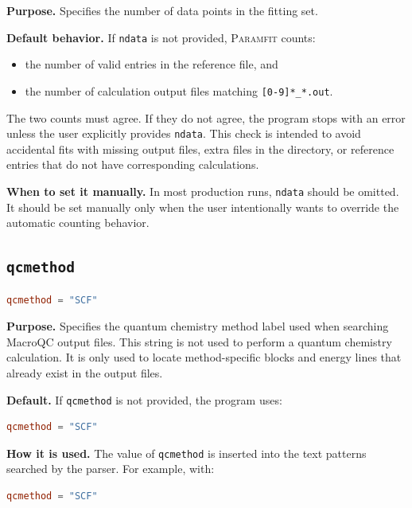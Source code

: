 \documentclass[11pt]{article}
\begin{document}
\textbf{Purpose.}
Specifies the number of data points in the fitting set.

\textbf{Default behavior.}
If \texttt{ndata} is not provided, \textsc{Paramfit} counts:

\begin{itemize}[leftmargin=*]
  \item the number of valid entries in the reference file, and
  \item the number of calculation output files matching \texttt{[0-9]*\_*.out}.
\end{itemize}

The two counts must agree. If they do not agree, the program stops with an error
unless the user explicitly provides \texttt{ndata}. This check is intended to
avoid accidental fits with missing output files, extra files in the directory,
or reference entries that do not have corresponding calculations.

\textbf{When to set it manually.}
In most production runs, \texttt{ndata} should be omitted. It should be set
manually only when the user intentionally wants to override the automatic
counting behavior.

\subsection{\texttt{qcmethod}}

\begin{lstlisting}[language=toml]
qcmethod = "SCF"
\end{lstlisting}

\textbf{Purpose.}
Specifies the quantum chemistry method label used when searching MacroQC output
files. This string is not used to perform a quantum chemistry calculation. It is
only used to locate method-specific blocks and energy lines that already exist
in the output files.

\textbf{Default.}
If \texttt{qcmethod} is not provided, the program uses:

\begin{lstlisting}[language=toml]
qcmethod = "SCF"
\end{lstlisting}

\textbf{How it is used.}
The value of \texttt{qcmethod} is inserted into the text patterns searched by
the parser. For example, with:

\begin{lstlisting}[language=toml]
qcmethod = "SCF"
\end{lstlisting}
\end{document}
